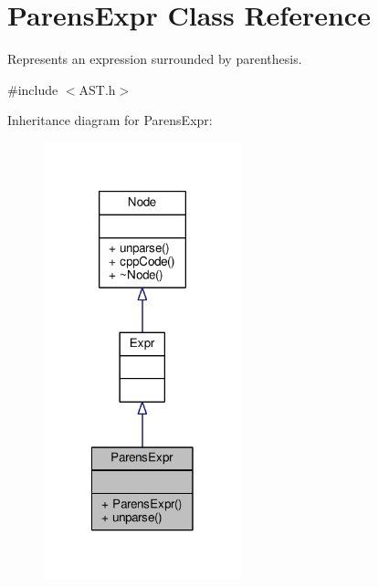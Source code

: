 \hypertarget{classParensExpr}{\section{Parens\-Expr Class Reference}
\label{classParensExpr}
}


Represents an expression surrounded by parenthesis. \par
  




{\ttfamily \#include $<$A\-S\-T.\-h$>$}



Inheritance diagram for Parens\-Expr\-:\nopagebreak
\begin{figure}[H]
\begin{center}
\leavevmode
\includegraphics[width=162pt]{classParensExpr__inherit__graph}
\end{center}
\end{figure}


